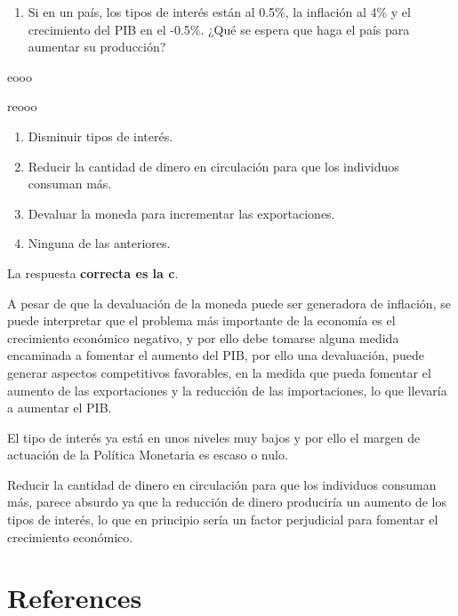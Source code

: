 \documentclass[
  letterpaper,
  DIV=11,
  numbers=noendperiod]{scrreprt}
\providecommand{\tightlist}{%
  \setlength{\itemsep}{0pt}\setlength{\parskip}{0pt}}\usepackage{longtable,booktabs,array}
\newlength{\cslhangindent}
\newlength{\cslentryspacingunit} %
\newenvironment{CSLReferences}[2] %
 {%
  \setlength{\parindent}{0pt}
  \ifodd #1
  \let\oldpar\par
  \def\par{\hangindent=\cslhangindent\oldpar}
  \fi
  \setlength{\parskip}{#2\cslentryspacingunit}
 }%
 {}
\begin{document}
\begin{enumerate}
\def\labelenumi{\arabic{enumi}.}
\tightlist
\item
  Si en un país, los tipos de interés están al 0.5\%, la inflación al
  4\% y el crecimiento del PIB en el -0.5\%. ¿Qué se espera que haga el
  país para aumentar su producción?
\end{enumerate}

eooo

reooo

\begin{enumerate}
\def\labelenumi{\alph{enumi})}
\item
  Disminuir tipos de interés.
\item
  Reducir la cantidad de dinero en circulación para que los individuos
  consuman más.
\item
  Devaluar la moneda para incrementar las exportaciones.
\item
  Ninguna de las anteriores.
\end{enumerate}

\begin{tcolorbox}[enhanced jigsaw, opacityback=0, colback=white, breakable, leftrule=.75mm, rightrule=.15mm, arc=.35mm, toprule=.15mm, bottomrule=.15mm, left=2mm, colframe=quarto-callout-tip-color-frame]
\begin{minipage}[t]{5.5mm}
\textcolor{quarto-callout-tip-color}{\faLightbulb}
\end{minipage}%
\begin{minipage}[t]{\textwidth - 5.5mm}

La respuesta \textbf{correcta es la c}.

A pesar de que la devaluación de la moneda puede ser generadora de
inflación, se puede interpretar que el problema más importante de la
economía es el crecimiento económico negativo, y por ello debe tomarse
alguna medida encaminada a fomentar el aumento del PIB, por ello una
devaluación, puede generar aspectos competitivos favorables, en la
medida que pueda fomentar el aumento de las exportaciones y la reducción
de las importaciones, lo que llevaría a aumentar el PIB.

El tipo de interés ya está en unos niveles muy bajos y por ello el
margen de actuación de la Política Monetaria es escaso o nulo.

Reducir la cantidad de dinero en circulación para que los individuos
consuman más, parece absurdo ya que la reducción de dinero produciría un
aumento de los tipos de interés, lo que en principio sería un factor
perjudicial para fomentar el crecimiento económico.

\end{minipage}%
\end{tcolorbox}


\hypertarget{references}{%
\chapter*{References}\label{references}}


\hypertarget{refs}{}
\begin{CSLReferences}{0}{0}
\end{CSLReferences}
\end{document}
